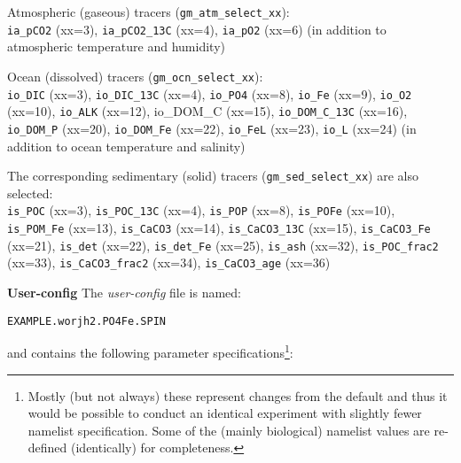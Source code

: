 \documentclass[10pt,twoside]{article}
\begin{document}
\begin{compactenum}
        \item Atmospheric (gaseous) tracers (\texttt{gm\_atm\_select\_xx}):
        \\\texttt{ia\_pCO2} (xx=3), \texttt{ia\_pCO2\_13C} (xx=4), \texttt{ia\_pO2} (xx=6)
                (in addition to atmospheric temperature and humidity)
        \item Ocean (dissolved) tracers (\texttt{gm\_ocn\_select\_xx}):
        \\\texttt{io\_DIC} (xx=3), \texttt{io\_DIC\_13C} (xx=4), \texttt{io\_PO4} (xx=8), \texttt{io\_Fe} (xx=9), \texttt{io\_O2} (xx=10), \texttt{io\_ALK} (xx=12), io\_DOM\_C (xx=15), \texttt{io\_DOM\_C\_13C} (xx=16), \texttt{io\_DOM\_P} (xx=20), \texttt{io\_DOM\_Fe} (xx=22), \texttt{io\_FeL} (xx=23), \texttt{io\_L} (xx=24)
                (in addition to ocean temperature and salinity)
        \item The corresponding sedimentary (solid) tracers (\texttt{gm\_sed\_select\_xx}) are also selected:
        \\\texttt{is\_POC} (xx=3), \texttt{is\_POC\_13C} (xx=4), \texttt{is\_POP} (xx=8), \texttt{is\_POFe} (xx=10), \texttt{is\_POM\_Fe} (xx=13), \texttt{is\_CaCO3} (xx=14), \texttt{is\_CaCO3\_13C} (xx=15), \texttt{is\_CaCO3\_Fe} (xx=21), \texttt{is\_det} (xx=22), \texttt{is\_det\_Fe} (xx=25), \texttt{is\_ash} (xx=32), \texttt{is\_POC\_frac2} (xx=33), \texttt{is\_CaCO3\_frac2} (xx=34), \texttt{is\_CaCO3\_age} (xx=36)
\end{compactenum}

\noindent \textbf{User-config} The \textit{user-config} file is named:
\vspace{-10pt}\begin{verbatim}EXAMPLE.worjh2.PO4Fe.SPIN\end{verbatim}\vspace{-10pt} and contains the following parameter specifications\footnote{Mostly (but not always) these represent changes from the default and thus it would be possible to conduct an identical experiment with slightly fewer namelist specification. Some of the (mainly biological) namelist values are re-defined (identically) for completeness.}:
\end{document}
